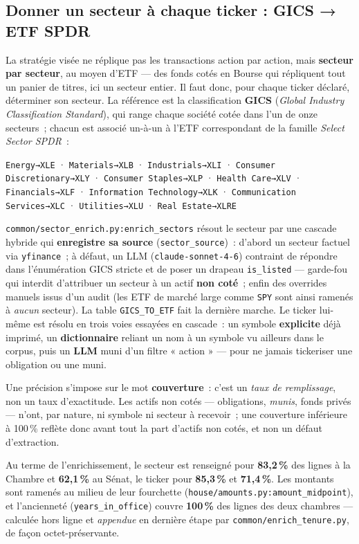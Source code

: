 \documentclass[11pt,a4paper]{article}
\newcommand{\co}[1]{\texttt{\small #1}}
\begin{document}
\subsection{Donner un secteur à chaque ticker : GICS → ETF SPDR}
\label{sec:sector}
La stratégie visée ne réplique pas les transactions action par action, mais \textbf{secteur par secteur}, au
moyen d'ETF — des fonds cotés en Bourse qui répliquent tout un panier de titres, ici un secteur entier. Il
faut donc, pour chaque ticker déclaré, déterminer son secteur. La référence est la classification
\textbf{GICS} (\emph{Global Industry Classification Standard}), qui range chaque société cotée dans l'un de
onze secteurs~; chacun est associé un-à-un à l'ETF correspondant de la famille \emph{Select Sector SPDR}~:
\begin{center}\footnotesize
\co{Energy→XLE} · \co{Materials→XLB} · \co{Industrials→XLI} · \co{Consumer Discretionary→XLY} ·
\co{Consumer Staples→XLP} · \co{Health Care→XLV} · \co{Financials→XLF} · \co{Information Technology→XLK}
· \co{Communication Services→XLC} · \co{Utilities→XLU} · \co{Real Estate→XLRE}
\end{center}

\co{common/sector_enrich.py:enrich_sectors} résout le secteur par une cascade hybride qui \textbf{enregistre
sa source} (\co{sector_source})~: d'abord un secteur factuel via \co{yfinance}~; à défaut, un LLM
(\co{claude-sonnet-4-6}) contraint de répondre dans l'énumération GICS stricte et de poser un drapeau
\co{is_listed} — garde-fou qui interdit d'attribuer un secteur à un actif \textbf{non coté}~; enfin des
overrides manuels issus d'un audit (les ETF de marché large comme \co{SPY} sont ainsi ramenés à
\emph{aucun} secteur). La table \co{GICS_TO_ETF} fait la dernière marche. Le ticker lui-même est résolu en
trois voies essayées en cascade~: un symbole \textbf{explicite} déjà imprimé, un \textbf{dictionnaire}
reliant un nom à un symbole vu ailleurs dans le corpus, puis un \textbf{LLM} muni d'un filtre « action » —
pour ne jamais tickeriser une obligation ou une muni.

Une précision s'impose sur le mot \textbf{couverture}~: c'est un \emph{taux de remplissage}, non un taux
d'exactitude. Les actifs non cotés — obligations, \emph{munis}, fonds privés — n'ont, par nature, ni symbole
ni secteur à recevoir~; une couverture inférieure à 100\,\% reflète donc avant tout la part d'actifs non
cotés, et non un défaut d'extraction.

Au terme de l'enrichissement, le secteur est renseigné pour \textbf{83,2\,\%} des lignes à la Chambre et
\textbf{62,1\,\%} au Sénat, le ticker pour \textbf{85,3\,\%} et \textbf{71,4\,\%}. Les montants sont ramenés
au milieu de leur fourchette (\co{house/amounts.py:amount_midpoint}), et l'ancienneté (\co{years_in_office})
couvre \textbf{100\,\%} des lignes des deux chambres — calculée hors ligne et \emph{appendue} en dernière
étape par \co{common/enrich_tenure.py}, de façon octet-préservante.
\end{document}
